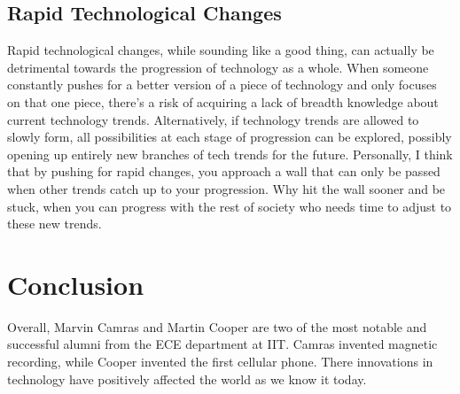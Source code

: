 \documentclass[12pt,letter]{article}
\begin{document}
\subsection{Rapid Technological Changes}
Rapid technological changes, while sounding like a good thing, can actually be detrimental towards the progression of technology as a whole. When someone constantly pushes for a better version of a piece of technology and only focuses on that one piece, there's a risk of acquiring a lack of breadth knowledge about current technology trends. Alternatively, if technology trends are allowed to slowly form, all possibilities at each stage of progression can be explored, possibly opening up entirely new branches of tech trends for the future. Personally, I think that by pushing for rapid changes, you approach a wall that can only be passed when other trends catch up to your progression. Why hit the wall sooner and be stuck, when you can progress with the rest of society who needs time to adjust to these new trends.
\section{Conclusion}
Overall, Marvin Camras and Martin Cooper are two of the most notable and successful alumni from the ECE department at IIT. Camras invented magnetic recording, while Cooper invented the first cellular phone. There innovations in technology have positively affected the world as we know it today.


\end{document}
